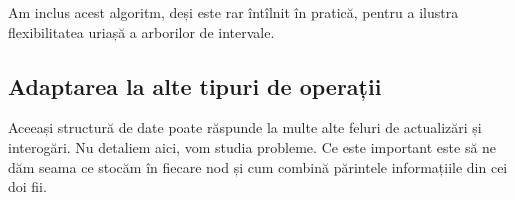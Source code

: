 Am inclus acest algoritm, deși este rar întîlnit în pratică, pentru a ilustra flexibilitatea uriașă a arborilor de intervale.

\subsection{Adaptarea la alte tipuri de operații}

Aceeași structură de date poate răspunde la multe alte feluri de actualizări și interogări. Nu detaliem aici, vom studia probleme. Ce este important este să ne dăm seama ce stocăm în fiecare nod și cum combină părintele informațiile din cei doi fii.
